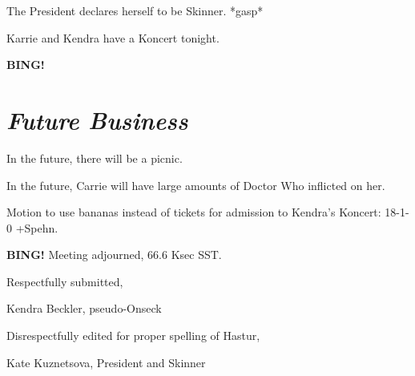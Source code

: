 \documentclass[10pt]{article}
\newcommand{\bing}{{\bf BING!} }
\newcommand{\goto}[1]{\bing \vskip 12pt \section*{{\em{#1}}}}
\begin{document}
The President declares herself to be Skinner.  *gasp*

Karrie and Kendra have a Koncert tonight.

\goto{Future Business}

In the future, there will be a picnic.

In the future, Carrie will have large amounts of Doctor Who inflicted on her.

Motion to use bananas instead of tickets for admission to Kendra's Koncert: 18-1-0 +Spehn.

\bing
\noindent
Meeting adjourned, 66.6 Ksec SST.

\vspace{18pt}

\centerline{Respectfully submitted,}
\centerline{Kendra Beckler, pseudo-Onseck}

\centerline{Disrespectfully edited for proper spelling of Hastur,}
\centerline{Kate Kuznetsova, President and Skinner}
\end{document}
